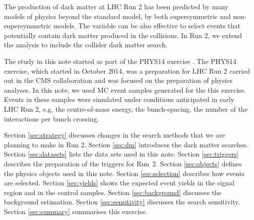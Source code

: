 The production of dark matter at LHC Run 2 has been predicted by many
models of physics beyond the standard model, by both supersymmetric and
non-supersymmetric models. The variable \alphat can be also effective to
select events that potentially contain dark matter produced in the
collisions. In Run 2, we extend the \alphat analysis to include the
collider dark matter search.

The study in this note started as part of the PHYS14 exercise
\cite{PHYS14}. The PHYS14 exercise, which started in October 2014, was a
preparation for LHC Run 2 carried out in the CMS collaboration and was
focused on the preparation of physics analyses. In this note, we used MC
event samples generated for the this exercise. Events in these samples
were simulated under conditions anticipated in early LHC Run 2, e.g, the
centre-of-mass energy, the bunch-spacing, the number of the interactions
per bunch crossing.

Section \ref{sec:strategy} discusses changes in the search methods that
we are planning to make in Run 2. Section \ref{sec:dm} introduces the
dark matter searches. Section \ref{sec:datasets} lists the data sets
used in this note. Section \ref{sec:triggers} describes the preparation
of the triggers for Run~2. Section \ref{sec:objects} defines the physics
objects used in this note. Section \ref{sec:selection} describes how
events are selected. Section \ref{sec:yields} shows the expected event
yields in the signal region and in the control samples. Section
\ref{sec:background} discusses the background estimation. Section
\ref{sec:sensitivity} discusses the search sensitivity. Section
\ref{sec:summary} summarises this exercise.





